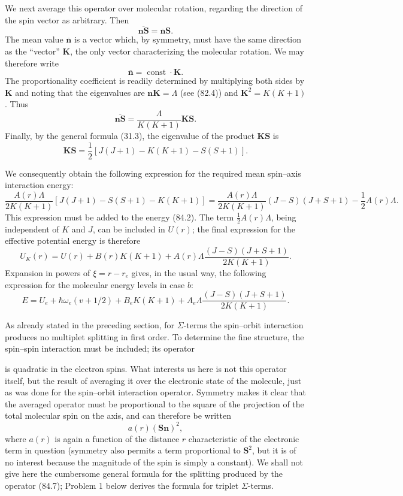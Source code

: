 We next average this operator over molecular rotation, regarding the direction of the spin vector as arbitrary. Then
\[
 \overline{\mathbf n\mathbf S}=\overline{\mathbf n}\mathbf S.
\]
The mean value $\overline{\mathbf n}$ is a vector which, by symmetry, must have the same direction as the ``vector'' $\mathbf K$, the only vector characterizing the molecular rotation. We may therefore write
\[
 \overline{\mathbf n}=\operatorname{const}\cdot\mathbf K.
\]
The proportionality coefficient is readily determined by multiplying both sides by $\mathbf K$ and noting that the eigenvalues are $\mathbf n\mathbf K=\Lambda$ (see (82.4)) and $\mathbf K^2=K(K+1)$. Thus
\[
 \overline{\mathbf n\mathbf S}=\frac{\Lambda}{K(K+1)}\mathbf K\mathbf S.
\]
Finally, by the general formula (31.3), the eigenvalue of the product $\mathbf K\mathbf S$ is
\begin{equation}
 \mathbf K\mathbf S=\frac12[J(J+1)-K(K+1)-S(S+1)].
 \tag{84.4}
\end{equation}

We consequently obtain the following expression for the required mean spin--axis interaction energy:
\[
 \frac{A(r)\Lambda}{2K(K+1)}[J(J+1)-S(S+1)-K(K+1)]
 =\frac{A(r)\Lambda}{2K(K+1)}(J-S)(J+S+1)-\frac12A(r)\Lambda.
\]
This expression must be added to the energy (84.2). The term $\frac12A(r)\Lambda$, being independent of $K$ and $J$, can be included in $U(r)$; the final expression for the effective potential energy is therefore
\begin{equation}
 U_K(r)=U(r)+B(r)K(K+1)+A(r)\Lambda\frac{(J-S)(J+S+1)}{2K(K+1)}.
 \tag{84.5}
\end{equation}
Expansion in powers of $\xi=r-r_e$ gives, in the usual way, the following expression for the molecular energy levels in case $b$:
\begin{equation}
 E=U_e+\hbar\omega_e(v+1/2)+B_eK(K+1)+A_e\Lambda\frac{(J-S)(J+S+1)}{2K(K+1)}.
 \tag{84.6}
\end{equation}

As already stated in the preceding section, for $\Sigma$-terms the spin--orbit interaction produces no multiplet splitting in first order. To determine the fine structure, the spin--spin interaction must be included; its operator

is quadratic in the electron spins. What interests us here is not this operator itself, but the result of averaging it over the electronic state of the molecule, just as was done for the spin--orbit interaction operator. Symmetry makes it clear that the averaged operator must be proportional to the square of the projection of the total molecular spin on the axis, and can therefore be written
\begin{equation}
 a(r)(\mathbf S\mathbf n)^2,
 \tag{84.7}
\end{equation}
where $a(r)$ is again a function of the distance $r$ characteristic of the electronic term in question (symmetry also permits a term proportional to $\mathbf S^2$, but it is of no interest because the magnitude of the spin is simply a constant). We shall not give here the cumbersome general formula for the splitting produced by the operator (84.7); Problem 1 below derives the formula for triplet $\Sigma$-terms.

